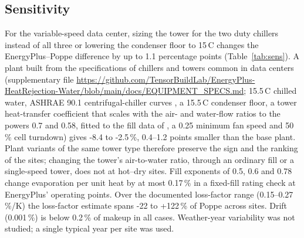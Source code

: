\documentclass[preprint,12pt]{elsarticle}
\begin{document}
\subsection{Sensitivity}\label{sec:sensitivity}
For the variable-speed data center, sizing the tower for the two duty chillers instead of all three or lowering the condenser floor to
15\,\textdegree C changes the EnergyPlus--Poppe difference by up to 1.1 percentage points (Table~\ref{tab:sens}). A plant
built from the specifications of chillers and towers common in data centers (supplementary file \url{https://github.com/TensorBuildLab/EnergyPlus-HeatRejection-Water/blob/main/docs/EQUIPMENT_SPECS.md};
15.5\,\textdegree C chilled water, ASHRAE 90.1 centrifugal-chiller curves \citep{ashrae2019addendumbd}, a 15.5\,\textdegree C
condenser floor, a tower heat-transfer coefficient that scales with the air- and water-flow ratios to the powers 0.7 and
0.58, fitted to the fill data of \citet{kloppers2003critical}, a 0.25 minimum
fan speed and 50\,\% cell turndown) gives -8.4 to -2.5\,\%, 0.4--1.2 points smaller than the base plant. Plant variants of
the same tower type therefore preserve the sign and the ranking of the sites; changing the tower's air-to-water ratio,
through an ordinary fill or a single-speed tower, does not at hot--dry sites. Fill exponents of 0.5, 0.6 and 0.78 change
evaporation per unit heat by at most 0.17\,\% in a fixed-fill rating check at EnergyPlus' operating points. Over the
documented loss-factor range (0.15--0.27\,\%/K) the loss-factor estimate spans -22 to +122\,\% of Poppe across sites. Drift
(0.001\,\%) is below 0.2\,\% of makeup in all cases. Weather-year variability was not studied; a single typical year per site
was used.

\begin{table}[t]\centering\small
\caption{Variable-speed data center: EnergyPlus saturated exit vs Poppe annual evaporation [\%] for plant variants.
$^a$15.5\,\textdegree C chilled water and condenser floor, ASHRAE 90.1 chiller curves, fill-data heat-transfer curves, 0.25 minimum fan
speed, 50\,\% cell turndown. $^b$Same simulations as the base plant, tower replaced by an ordinary fill
(Section~\ref{sec:consistency}); hours the ordinary tower cannot meet are excluded. Variants with ``--'' were run only at
the four sites shown.}\label{tab:sens}

\end{table}
\end{document}
